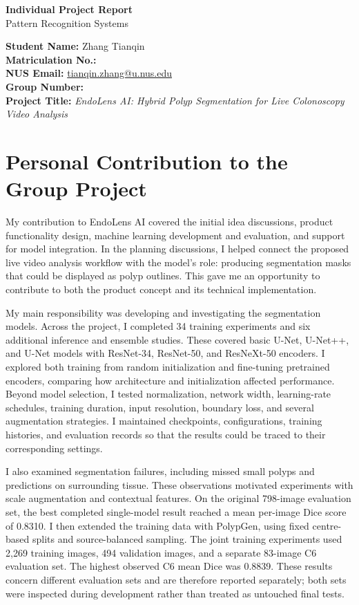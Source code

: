 \documentclass[11pt,a4paper]{article}
\begin{document}
\begin{center}
{\Large\bfseries Individual Project Report}\\[4pt]
{\normalsize Pattern Recognition Systems}\par
\end{center}
\textbf{Student Name:} Zhang Tianqin\\
\textbf{Matriculation No.:} \underline{\hspace{4cm}}\\
\textbf{NUS Email:} \href{mailto:tianqin.zhang@u.nus.edu}{tianqin.zhang@u.nus.edu}\\
\textbf{Group Number:} \underline{\hspace{2cm}}\\
\textbf{Project Title:} \textit{EndoLens AI: Hybrid Polyp Segmentation for Live Colonoscopy Video Analysis}

\section{Personal Contribution to the Group Project}
My contribution to EndoLens AI covered the initial idea discussions, product functionality design, machine learning development and evaluation, and support for model integration. In the planning discussions, I helped connect the proposed live video analysis workflow with the model's role: producing segmentation masks that could be displayed as polyp outlines. This gave me an opportunity to contribute to both the product concept and its technical implementation.

My main responsibility was developing and investigating the segmentation models. Across the project, I completed 34 training experiments and six additional inference and ensemble studies. These covered basic U-Net, U-Net++, and U-Net models with ResNet-34, ResNet-50, and ResNeXt-50 encoders. I explored both training from random initialization and fine-tuning pretrained encoders, comparing how architecture and initialization affected performance. Beyond model selection, I tested normalization, network width, learning-rate schedules, training duration, input resolution, boundary loss, and several augmentation strategies. I maintained checkpoints, configurations, training histories, and evaluation records so that the results could be traced to their corresponding settings.

I also examined segmentation failures, including missed small polyps and predictions on surrounding tissue. These observations motivated experiments with scale augmentation and contextual features. On the original 798-image evaluation set, the best completed single-model result reached a mean per-image Dice score of 0.8310. I then extended the training data with PolypGen, using fixed centre-based splits and source-balanced sampling. The joint training experiments used 2,269 training images, 494 validation images, and a separate 83-image C6 evaluation set. The highest observed C6 mean Dice was 0.8839. These results concern different evaluation sets and are therefore reported separately; both sets were inspected during development rather than treated as untouched final tests.
\end{document}
